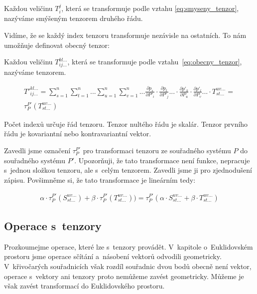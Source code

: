 \documentclass{book}
\begin{document}
Každou veličinu \(T_i^j\), která se transformuje podle vztahu \eqref{eq:smyseny_tenzor}, nazýváme smýšeným tenzorem druhého řádu.

Vidíme, že se každý index tenzoru transformuje nezávisle na ostatních. To nám umožňuje definovat obecný tenzor:

\begin{fact}

Každou veličinu \(T_{ij...}^{kl...}\), která se transformuje podle vztahu~\eqref{eq:obecny_tenzor}, nazýváme tenzorem.

\begin{equation}
\label{eq:obecny_tenzor}
\begin{split}
T'^{kl...}_{ij...} = \sum_{s=1}^n \sum_{t=1}^n ... \sum_{u=1}^n \sum_{v=1}^n ... \frac{\partial p_s}{\partial P'_i} \cdot \frac{\partial p_t}{\partial P'_j} ... \cdot \frac{\partial p'_k}{\partial P_u} \cdot \frac{\partial p'_l}{\partial P_v} ... \cdot T_{st...}^{uv...} = \\
\tau_{P}^{P'} (T_{st...}^{uv...})
\end{split}
\end{equation}

\end{fact}

Počet indexů určuje řád tenzoru. Tenzor nultého řádu je skalár. Tenzor prvního řádu je kovariantní nebo kontravariantní vektor.

Zavedli jsme označení \(\tau_{P}^{P'}\) pro transformaci tenzoru ze souřadného systému \(P\) do souřadného systému \(P'\). Upozorňuji, že tato transformace není funkce, nepracuje s~jednou složkou tenzoru, ale s~celým tenzorem. Zavedli jsme ji pro zjednodušení zápisu. Povšimněme si, že tato transformace je lineárním tedy:

\begin{equation}
\label{eq:linearni_transformace_tenzoru}
\begin{split}
\alpha \cdot \tau_{P}^{P'}(S_{st...}^{uv...}) + \beta \cdot \tau_{P}^{P'}(T_{st...}^{uv...})) = \tau_{P}^{P'}(\alpha \cdot S_{st...}^{uv...} + \beta \cdot T_{st...}^{uv...})
\end{split}
\end{equation}

\subsection{Operace s~tenzory}

Prozkoumejme operace, které lze s~tenzory provádět. V~kapitole o~Euklidovském prostoru jsme operace sčítání a~násobení vektorů odvodili geometricky. V~křivočarých souřadnicích však rozdíl souřadnic dvou bodů obecně není vektor, operace s~vektory ani tenzory proto nemůžeme zavést geometricky. Můžeme je však zavést transformací do Euklidovského prostoru.
\end{document}
